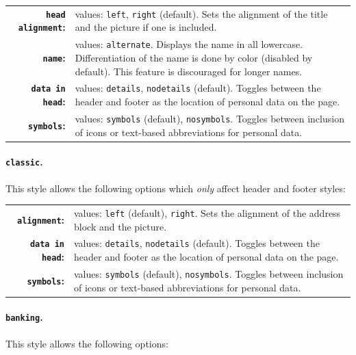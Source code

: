\documentclass[a4paper, 11pt]{article}
\newcommand{\code}[1]{\lstinline!#1!}
\begin{document}
\begin{tabular}{r@{\hspace{2ex}}p{}}
  \textbf{\code{head alignment}:} & values: \code{left}, \code{right} (default).
  Sets the alignment of the title and the picture if one is included. \\
  \textbf{\code{name}:}           & values: \code{alternate}.
  Displays the name in all lowercase.
  Differentiation of the name is done by color (disabled by default).
  This feature is discouraged for longer names. \\
  \textbf{\code{data in head}:}   & values: \code{details}, \code{nodetails} (default).
  Toggles between the header and footer as the location of personal data on the page. \\
  \textbf{\code{symbols}:}        & values: \code{symbols} (default), \code{nosymbols}.
  Toggles between inclusion of icons or text-based abbreviations for personal data.
\end{tabular}

\paragraph{\code{classic}.}
This style allows the following options which \emph{only} affect header and footer styles:

\begin{tabular}{r@{\hspace{2ex}}p{}}
  \textbf{\code{alignment}:}    & values: \code{left} (default), \code{right}.
  Sets the alignment of the address block and the picture. \\
  \textbf{\code{data in head}:} & values: \code{details}, \code{nodetails} (default).
  Toggles between the header and footer as the location of personal data on the page. \\
  \textbf{\code{symbols}:}      & values: \code{symbols} (default), \code{nosymbols}.
  Toggles between inclusion of icons or text-based abbreviations for personal data.
\end{tabular}

\paragraph{\code{banking}.}
This style allows the following options:
\end{document}
